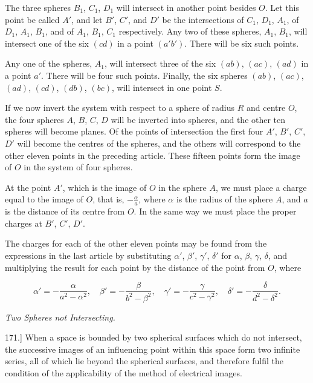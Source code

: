 \documentclass[11pt,a4paper]{article}
\begin{document}
The three spheres $B_1$, $C_1$, $D_1$ will intersect in another point
besides $O$. Let this point be called $A'$, and let $B'$, $C'$, and
$D'$ be the intersections of $C_1$, $D_1$, $A_1$, of $D_1$, $A_1$,
$B_1$, and of $A_1$, $B_1$, $C_1$ respectively. Any two of these
spheres, $A_1$, $B_1$, will intersect one of the six $(cd)$ in a point
$(a'b')$. There will be six such points.

Any one of the spheres, $A_1$, will intersect three of the six $(ab)$,
$(ac)$, $(ad)$ in a point $a'$. There will be four such points.
Finally, the six spheres $(ab)$, $(ac)$, $(ad)$, $(cd)$, $(db)$,
$(bc)$, will intersect in one point $S$.

If we now invert the system with respect to a sphere of radius $R$ and
centre $O$, the four spheres $A$, $B$, $C$, $D$ will be inverted into
spheres, and the other ten spheres will become planes. Of the points of
intersection the first four $A'$, $B'$, $C'$, $D'$ will become the
centres of the spheres, and the others will correspond to the other
eleven points in the preceding article. These fifteen points form the
image of $O$ in the system of four spheres.

At the point $A'$, which is the image of $O$ in the sphere $A$, we must
place a charge equal to the image of $O$, that is, $-\frac{\alpha}{a}$,
where $\alpha$ is the radius of the sphere $A$, and $a$ is the distance
of its centre from $O$. In the same way we must place the proper
charges at $B'$, $C'$, $D'$.

The charges for each of the other eleven points may be found from the
expressions in the last article by substituting $\alpha'$, $\beta'$,
$\gamma'$, $\delta'$ for $\alpha$, $\beta$, $\gamma$, $\delta$, and
multiplying the result for each point by the distance of the point from
$O$, where

\[
\alpha'=-\frac{\alpha}{a^2-\alpha^2},\quad
\beta'=-\frac{\beta}{b^2-\beta^2},\quad
\gamma'=-\frac{\gamma}{c^2-\gamma^2},\quad
\delta'=-\frac{\delta}{d^2-\delta^2}.
\]

\begin{center}
\textit{Two Spheres not Intersecting.}
\end{center}

171.] When a space is bounded by two spherical surfaces which do not
intersect, the successive images of an influencing point within this
space form two infinite series, all of which lie beyond the spherical
surfaces, and therefore fulfil the condition of the applicability of
the method of electrical images.
\end{document}
